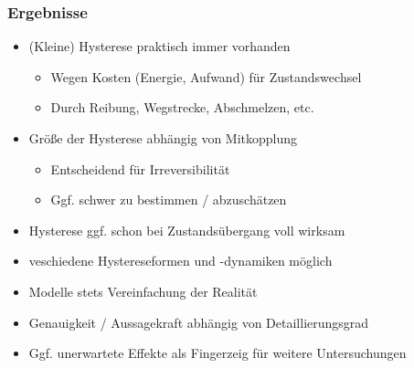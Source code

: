 \documentclass{beamer}
\begin{document}
\begin{frame}[t]
  \frametitle{Ergebnisse}
  \begin{itemize}
    \item<2->  (Kleine) Hysterese praktisch immer
      vorhanden
      \begin{itemize}
      \item<3->  Wegen \glqq{}Kosten\grqq{} (Energie,
        Aufwand) für Zustandswechsel
      \item<4->  Durch Reibung, Wegstrecke,
        Abschmelzen, etc.
      \end{itemize}
    \item<5->  Größe der Hysterese abhängig von Mitkopplung
      \begin{itemize}
      \item<6->  Entscheidend für Irreversibilität
      \item<7->  Ggf. schwer zu bestimmen / abzuschätzen
      \end{itemize}
    \item<8->  Hysterese ggf. schon bei Zustandsübergang voll wirksam
    \item<9->  veschiedene Hystereseformen und -dynamiken möglich
    \item<10->  Modelle stets Vereinfachung der Realität
    \item<11->  Genauigkeit / Aussagekraft abhängig von Detaillierungsgrad
    \item<12->  Ggf. unerwartete Effekte als Fingerzeig für weitere Untersuchungen
  \end{itemize}
\end{frame}
\end{document}

